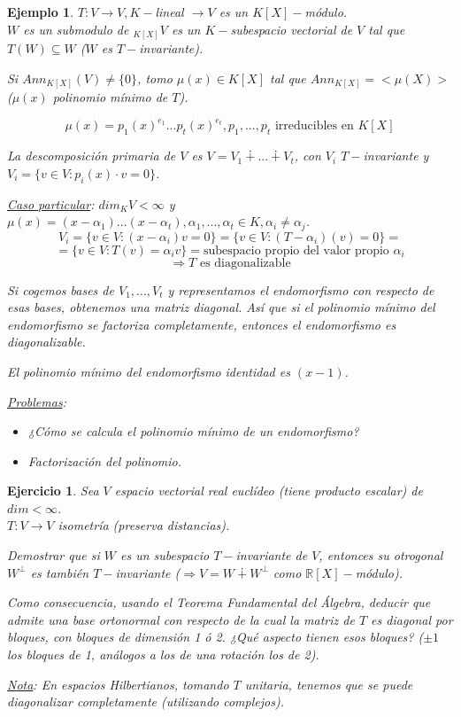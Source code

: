 \documentclass[11pt,a4paper]{article}
\theoremstyle{break}
\newtheorem{example}[theorem]{Ejemplo}
\newtheorem{task}[theorem]{Ejercicio}
\begin{document}
\begin{example}
$T: V \to V, K-$lineal $\rightarrow V$ es un $K[X]-$módulo. \\
$W$ es un submodulo de $_{K[X]}V$ es un $K-$subespacio vectorial de $V$ tal que $T(W) \subseteq W$ ($W$ es $T-$invariante).

Si $Ann_{K[X]}(V) \neq \{0\}$, tomo $\mu(x) \in K[X]$ tal que $Ann_{K[X]} = <\mu(X)>$ ($\mu(x)$ polinomio mínimo de $T$).

$$\mu(x) = p_{1}(x)^{e_{1}} ... p_{t}(x)^{e_{t}}, p_{1}, ..., p_{t} \text{ irreducibles en } K[X]$$

La descomposición primaria de $V$ es $V = V_{1} \dotplus ... \dotplus V_{t}$, con $V_{i}$ $T-$invariante y $V_{i} = \{v \in V: p_{i}(x) \cdot v = 0\}$.

\underline{Caso particular}: $dim_{K} V < \infty$ y $\mu(x) = (x - \alpha_{1}) ... (x - \alpha_{t}), \alpha_{1}, ..., \alpha_{t} \in K, \alpha_{i} \neq \alpha_{j}$.
$$V_{i} = \{v \in V: (x - \alpha_{i}) v = 0\} = \{v \in V: (T - \alpha_{i})(v) = 0\} =$$
$$= \{v \in V: T(v) = \alpha_{i} v\} = \text{subespacio propio del valor propio } \alpha_{i}$$
$$\Rightarrow T \text{ es diagonalizable}$$

Si cogemos bases de $V_{1}, ..., V_{t}$ y representamos el endomorfismo con respecto de esas bases, obtenemos una matriz diagonal. Así que si el polinomio mínimo del endomorfismo se factoriza completamente, entonces el endomorfismo es diagonalizable.

El polinomio mínimo del endomorfismo identidad es $(x -1)$.

\underline{Problemas}: 
\begin{itemize}
\item ¿Cómo se calcula el polinomio mínimo de un endomorfismo?
\item Factorización del polinomio.
\end{itemize}
\end{example}

\begin{task}
Sea $V$ espacio vectorial real euclídeo (tiene producto escalar) de $dim < \infty$. \\
$T: V \to V$ isometría (preserva distancias).

Demostrar que si $W$ es un subespacio $T-$invariante de $V$, entonces su otrogonal $W^{\bot}$ es también $T-$invariante ($\Rightarrow V = W \dotplus W^{\bot}$ como $\mathbb{R}[X]-$módulo).

Como consecuencia, usando el Teorema Fundamental del Álgebra, deducir que admite una base ortonormal con respecto de la cual la matriz de $T$ es diagonal por bloques, con bloques de dimensión 1 ó 2. ¿Qué aspecto tienen esos bloques? ($\pm 1$ los bloques de 1, análogos a los de una rotación los de 2).

\underline{Nota}: En espacios Hilbertianos, tomando $T$ unitaria, tenemos que se puede diagonalizar completamente (utilizando complejos).
\end{task}
\end{document}
